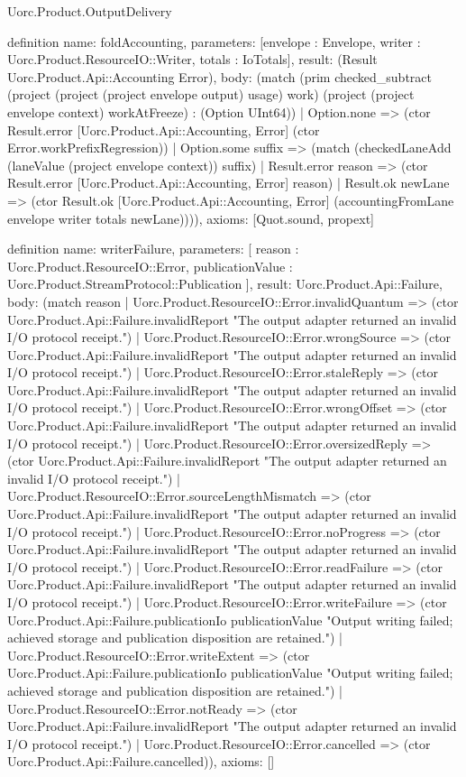 \begin{lexlean}{Uorc.Product.OutputDelivery}
\begin{semanticmodule}
definition{
  name: foldAccounting,
  parameters: [envelope : Envelope, writer : Uorc.Product.ResourceIO::Writer, totals : IoTotals],
  result: (Result Uorc.Product.Api::Accounting Error),
  body: (match (prim checked_subtract (project (project (project envelope output) usage) work) (project (project envelope context) workAtFreeze) : (Option UInt64))
    | Option.none => (ctor Result.error [Uorc.Product.Api::Accounting, Error] (ctor Error.workPrefixRegression))
    | Option.some suffix => (match (checkedLaneAdd (laneValue (project envelope context)) suffix)
      | Result.error reason => (ctor Result.error [Uorc.Product.Api::Accounting, Error] reason)
      | Result.ok newLane => (ctor Result.ok [Uorc.Product.Api::Accounting, Error] (accountingFromLane envelope writer totals newLane)))),
  axioms: [Quot.sound, propext]
}

definition{
  name: writerFailure,
  parameters: [
    reason : Uorc.Product.ResourceIO::Error,
    publicationValue : Uorc.Product.StreamProtocol::Publication
  ],
  result: Uorc.Product.Api::Failure,
  body: (match reason
    | Uorc.Product.ResourceIO::Error.invalidQuantum => (ctor Uorc.Product.Api::Failure.invalidReport "The output adapter returned an invalid I/O protocol receipt.")
    | Uorc.Product.ResourceIO::Error.wrongSource => (ctor Uorc.Product.Api::Failure.invalidReport "The output adapter returned an invalid I/O protocol receipt.")
    | Uorc.Product.ResourceIO::Error.staleReply => (ctor Uorc.Product.Api::Failure.invalidReport "The output adapter returned an invalid I/O protocol receipt.")
    | Uorc.Product.ResourceIO::Error.wrongOffset => (ctor Uorc.Product.Api::Failure.invalidReport "The output adapter returned an invalid I/O protocol receipt.")
    | Uorc.Product.ResourceIO::Error.oversizedReply => (ctor Uorc.Product.Api::Failure.invalidReport "The output adapter returned an invalid I/O protocol receipt.")
    | Uorc.Product.ResourceIO::Error.sourceLengthMismatch => (ctor Uorc.Product.Api::Failure.invalidReport "The output adapter returned an invalid I/O protocol receipt.")
    | Uorc.Product.ResourceIO::Error.noProgress => (ctor Uorc.Product.Api::Failure.invalidReport "The output adapter returned an invalid I/O protocol receipt.")
    | Uorc.Product.ResourceIO::Error.readFailure => (ctor Uorc.Product.Api::Failure.invalidReport "The output adapter returned an invalid I/O protocol receipt.")
    | Uorc.Product.ResourceIO::Error.writeFailure => (ctor Uorc.Product.Api::Failure.publicationIo publicationValue "Output writing failed; achieved storage and publication disposition are retained.")
    | Uorc.Product.ResourceIO::Error.writeExtent => (ctor Uorc.Product.Api::Failure.publicationIo publicationValue "Output writing failed; achieved storage and publication disposition are retained.")
    | Uorc.Product.ResourceIO::Error.notReady => (ctor Uorc.Product.Api::Failure.invalidReport "The output adapter returned an invalid I/O protocol receipt.")
    | Uorc.Product.ResourceIO::Error.cancelled => (ctor Uorc.Product.Api::Failure.cancelled)),
  axioms: []
}


\end{semanticmodule}
\end{lexlean}
